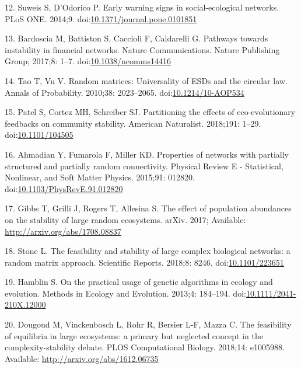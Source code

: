 \documentclass[]{article}
\begin{document}
\hypertarget{ref-Suweis2014}{}
12. Suweis S, D'Odorico P. Early warning signs in social-ecological
networks. PLoS ONE. 2014;9.
doi:\href{https://doi.org/10.1371/journal.pone.0101851}{10.1371/journal.pone.0101851}

\hypertarget{ref-Bardoscia2017}{}
13. Bardoscia M, Battiston S, Caccioli F, Caldarelli G. Pathways towards
instability in financial networks. Nature Communications. Nature
Publishing Group; 2017;8: 1--7.
doi:\href{https://doi.org/10.1038/ncomms14416}{10.1038/ncomms14416}

\hypertarget{ref-Tao2010}{}
14. Tao T, Vu V. Random matrices: Universality of ESDs and the circular
law. Annals of Probability. 2010;38: 2023--2065.
doi:\href{https://doi.org/10.1214/10-AOP534}{10.1214/10-AOP534}

\hypertarget{ref-Patel2018}{}
15. Patel S, Cortez MH, Schreiber SJ. Partitioning the effects of
eco-evolutionary feedbacks on community stability. American Naturalist.
2018;191: 1--29.
doi:\href{https://doi.org/10.1101/104505}{10.1101/104505}

\hypertarget{ref-Ahmadian2015}{}
16. Ahmadian Y, Fumarola F, Miller KD. Properties of networks with
partially structured and partially random connectivity. Physical Review
E - Statistical, Nonlinear, and Soft Matter Physics. 2015;91: 012820.
doi:\href{https://doi.org/10.1103/PhysRevE.91.012820}{10.1103/PhysRevE.91.012820}

\hypertarget{ref-Gibbs2017}{}
17. Gibbs T, Grilli J, Rogers T, Allesina S. The effect of population
abundances on the stability of large random ecosystems. arXiv. 2017;
Available: \url{http://arxiv.org/abs/1708.08837}

\hypertarget{ref-Stone2017}{}
18. Stone L. The feasibility and stability of large complex biological
networks: a random matrix approach. Scientific Reports. 2018;8: 8246.
doi:\href{https://doi.org/10.1101/223651}{10.1101/223651}

\hypertarget{ref-Hamblin2013}{}
19. Hamblin S. On the practical usage of genetic algorithms in ecology
and evolution. Methods in Ecology and Evolution. 2013;4: 184--194.
doi:\href{https://doi.org/10.1111/2041-210X.12000}{10.1111/2041-210X.12000}

\hypertarget{ref-Dougoud2018}{}
20. Dougoud M, Vinckenbosch L, Rohr R, Bersier L-F, Mazza C. The
feasibility of equilibria in large ecosystems: a primary but neglected
concept in the complexity-stability debate. PLOS Computational Biology.
2018;14: e1005988. Available: \url{http://arxiv.org/abs/1612.06735}
\end{document}
